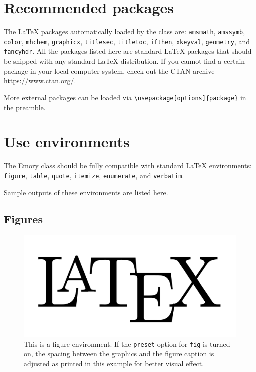 \documentclass[draft]{emory}
\begin{document}
\section{Recommended packages}
The \LaTeX{} packages automatically loaded by the class are: \Verb|amsmath|, 
\Verb|amssymb|, \Verb|color|, \Verb|mhchem|, \Verb|graphicx|, \Verb|titlesec|, 
\Verb|titletoc|, \Verb|ifthen|, \Verb|xkeyval|, \Verb|geometry|, and 
\Verb|fancyhdr|. All the packages listed here are standard \LaTeX{} packages 
that should be shipped with any standard \LaTeX{} distribution. If you cannot 
find a certain package in your local computer system, check out the CTAN 
archive \url{https://www.ctan.org/}.

More external packages can be loaded via \Verb|\usepackage[options]{package}|
in the preamble. 


\section{Use environments}\label{sec:env}
The Emory class should be fully compatible with standard \LaTeX{} environments:
\Verb|figure|, \Verb|table|, \Verb|quote|, \Verb|itemize|, \Verb|enumerate|,
and \Verb|verbatim|.

Sample outputs of these environments are listed here. 

\subsection{Figures}

\begin{figure}[htp!]
  \centering
  \includegraphics[width=\textwidth]{LaTeXLogo.png}
  \caption{This is a figure environment.\label{fig} If the 
  \protect\Verb|preset| option 
  for \protect\Verb|fig| is turned on, the spacing between the graphics and the 
  figure 
  caption is adjusted as printed in this example for better visual effect.}
\end{figure}
\end{document}
